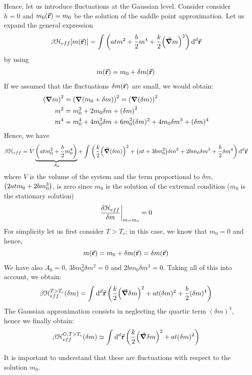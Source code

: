 \documentclass[../main/main.tex]{subfiles}
\begin{document}
Hence, let us introduce fluctuations at the Gaussian level. Consider consider \( h=0 \) and \( m_0 (\va{r})= m_0 \) be the solution of the saddle point approximation. Let us expand the general expression
\begin{equation*}
  \beta \mathcal{H}_{eff}  [m (\va{r})] = \int_{}^{}  \qty( a t m^2 + \frac{b}{2} m^4 + \frac{k}{2} \qty(\va{\grad } m)^2 ) \dd[d]{\va{r}}
\end{equation*}
by using
\begin{equation*}
  m(\va{r}) = m_0 + \delta m(\va{r})
\end{equation*}
If we assumed that the fluctuations \(  \delta m(\va{r})\) are small, we would obtain:
\begin{subequations}
\begin{align*}
   \qty(\grad m)^2 &= \qty(\grad \qty(m_0 + \delta m) )^2 = \qty(\grad \qty(\delta m) )^2  \\
     m^2 &= m_0^2 + 2 m_0 \delta m + \qty(\delta m)^2 \\
     m^4 &= m_0^4 + 4 m_0^3 \delta m + 6 m_0^2 (\delta m)^2 + 4 m_0 \delta m^3 + (\delta m)^4
\end{align*}
\end{subequations}
Hence, we have
\begin{equation}
  \beta \mathcal{H}_{eff} = V \underbrace{ \qty(a t m_0^2 + \frac{b}{2} m_0^4) }_{A_0}
  + \int_{}^{} \qty(\frac{k}{2}\qty( \va{\grad } (\delta m))^2 + \qty(a t + 3 b m_0^2)\delta  m^2 + 2 b m_0 \delta m^3 + \frac{b}{2} \delta m^4 )\dd[d]{\va{r}}
  \label{eq:18_10}
\end{equation}
where \( V \) is the volume of the system and the term proportional to \( \delta m \),  \( \qty( 2 a t m_0  +  2b m_0^3 )  \), is zero since \( m_0 \) is the solution of the extremal condition (\( m_0 \) is the stationary solution)
\begin{equation*}
  \eval{\frac{\delta \mathcal{H}_{eff}}{\delta m}}_{m=m_0} = 0
\end{equation*}
For simplicity let us first consider \( T>T_c \); in this case, we know that \( m_0 = 0 \) and hence,
\begin{equation*}
   m (\va{r}) = m_0 + \delta m(\va{r}) = \delta m (\va{r})
\end{equation*}
We have also \( A_0 =0 \),  \( 3bm_0^2 \delta m^2 = 0 \) and \( 2 b m_0 \delta m^3 = 0 \). Taking all of this into account, we obtain:
\begin{equation*}
  \beta \mathcal{H}_{eff}^{T>T_c} (\delta m)= \int_{}^{} \dd[d]{\va{r}} \qty(\frac{k}{2} \qty(\va{\grad }\delta m)^2 + a t (\delta m)^2 + \frac{b}{2} (\delta m)^4 )
\end{equation*}
The Gaussian approximation consists in neglecting the quartic term \( (\delta m)^4 \), hence we finally obtain:
\begin{equation}
    \beta \mathcal{H}_{eff}^{G,T>T_c} (\delta m) \simeq  \int_{}^{} \dd[d]{\va{r}} \qty(\frac{k}{2} \qty( \va{\grad } \delta m)^2 + a t (\delta m)^2 )
    \label{eq:18_4}
\end{equation}
\begin{remark}
It is important to understand that these are fluctuations with respect to the solution \( m_0 \).
\end{remark}
\end{document}
